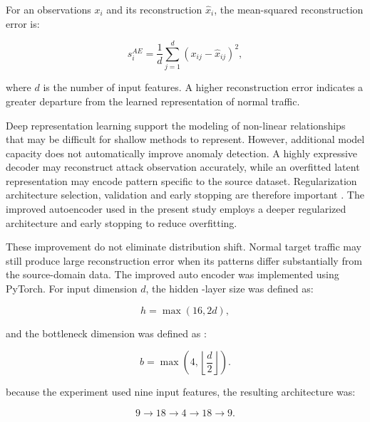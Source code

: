 For an observations \(x_i\) and its reconstruction \(\hat{x}_i\), the mean-squared reconstruction error is:

\begin{equation}
      s_i^{AE} =
      \frac{1}{d}
      \sum_{j=1}^{d}
      \left(x_{ij}-\hat{x}_{ij}\right)^2,
      \label{eq:ae-score}
\end{equation}

where \(d\) is the number of input features. A higher reconstruction error indicates a greater departure from the learned representation of normal traffic.

Deep representation learning support the modeling of non-linear relationships that may be difficult for shallow methods to represent. However, additional model capacity does not automatically improve anomaly detection. A highly expressive decoder may reconstruct attack observation accurately, while an overfitted latent representation may encode pattern specific to the source dataset. 
Regularization architecture selection, validation and early stopping are therefore important \cite{Pang2021,Yang2022}. The improved autoencoder used in the present study employs a deeper regularized architecture and early stopping to reduce overfitting.

These improvement do not eliminate distribution shift. Normal target traffic may still produce large reconstruction error when its patterns differ substantially from the source-domain data. 
The improved auto encoder was implemented using PyTorch. For input dimension \(d\), the hidden -layer size was defined as:

\begin{equation}
       h= \max(16,2d),
       \label{eq:ae-hidden-size}
\end{equation}

and the bottleneck dimension was defined as :

\begin{equation}
       b= \max\left(
                    4,
                    \left\lfloor\frac{d}{2}\right\rfloor
       \right).
       \label{eq:ae-bottleneck-size}
\end{equation}

because the experiment used nine input features, the resulting architecture was: 

\begin{equation}
       9 \rightarrow 18 \rightarrow 4
       \rightarrow 18 \rightarrow 9.
       \label{eq:ae-architecture}
\end{equation}

